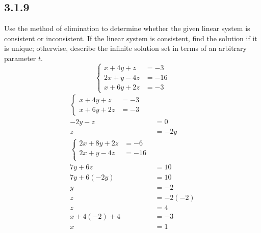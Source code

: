 \documentclass{article}
\begin{document}
\subsection{3.1.9}
Use the method of elimination to determine whether the given linear system is consistent or inconsistent. If the linear system is consistent, find the solution if it is unique; otherwise, describe the infinite solution set in terms of an arbitrary parameter $ t $.
\begin{equation*}
	\left\{
		\begin{aligned}
			x + 4y + z & = -3 \\
			2x + y - 4z & = -16 \\
			x + 6y + 2z & = -3
		\end{aligned}
	\right.
\end{equation*}
\begin{align*}
	\left\{
		\begin{aligned}
			x + 4y + z & = -3 \\
			x + 6y + 2z & = -3
		\end{aligned}
	\right. \\
	-2y - z & = 0 \\
	z & = -2y \\
	\left\{
		\begin{aligned}
			2x + 8y + 2z & = -6 \\
			2x + y - 4z & = -16 \\
		\end{aligned}
	\right. \\
	7y + 6z & = 10 \\
	7y + 6(-2y) & = 10 \\
	y & = -2 \\
	z & = -2(-2) \\
	z & = 4 \\
	x + 4(-2) + 4 & = -3 \\
	x & = 1
\end{align*}
\end{document}
